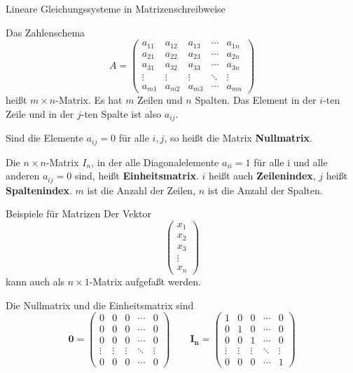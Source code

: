 \begin{frame}{Lineare Gleichungssysteme in Matrizenschreibweise}
	\begin{definition}
		Das Zahlenschema
		\[
		A = \begin{pmatrix}
		a_{11} & a_{12} & a_{13} & \cdots & a_{1n} \\
		a_{21} & a_{22} & a_{23} & \cdots & a_{2n} \\
		a_{31} & a_{32} & a_{33} & \cdots & a_{3n} \\
		\vdots & \vdots & \vdots  & \ddots & \vdots \\
		a_{m1} & a_{m2} & a_{m3} & \cdots & a_{mn}
		\end{pmatrix}
		\]
		heißt $m \times n$-Matrix. Es hat $m$ Zeilen und $n$ Spalten. Das Element in der $i$-ten Zeile und in der $j$-ten Spalte ist also $a_{ij}$.
		
		Sind die Elemente $a_{ij}=0$ für alle $i,j$, so heißt die Matrix \textbf{Nullmatrix}.
		
		Die $n \times n$-Matrix $I_n$, in der alle Diagonalelemente $a_{ii}=1$ für alle i und alle anderen $a_{ij}=0$ sind, heißt \textbf{Einheitsmatrix}.
		$i$ heißt auch \textbf{Zeilenindex}, $j$ heißt \textbf{Spaltenindex}. $m$ ist die Anzahl der Zeilen, $n$ ist die Anzahl der Spalten.
	\end{definition}
\end{frame}

\begin{frame}{Beispiele für Matrizen}
		Der Vektor
		\[
		\begin{pmatrix}
		x_1 \\ x_2 \\ x_3 \\ \vdots \\ x_n
		\end{pmatrix}
		\]
		kann auch als $n \times 1$-Matrix aufgefaßt werden.
		
		Die Nullmatrix und die Einheitsmatrix sind
		\[
		\pmb{0} = \begin{pmatrix}
		0 & 0 & 0 & \cdots & 0 \\
		0 & 0 & 0 & \cdots & 0 \\
		0 & 0 & 0 & \cdots & 0 \\
		\vdots & \vdots &  \vdots & \ddots  & \vdots \\
		0 & 0 & 0 & \cdots & 0
		\end{pmatrix} \qquad \pmb{I_n} = \begin{pmatrix}
		1 & 0 & 0 & \cdots & 0 \\
		0 & 1 & 0 & \cdots & 0 \\
		0 & 0 & 1 & \cdots & 0 \\
		\vdots & \vdots &  \vdots & \ddots & \vdots \\
		0 & 0 & 0 & \cdots & 1
		\end{pmatrix}
		\]
\end{frame}


